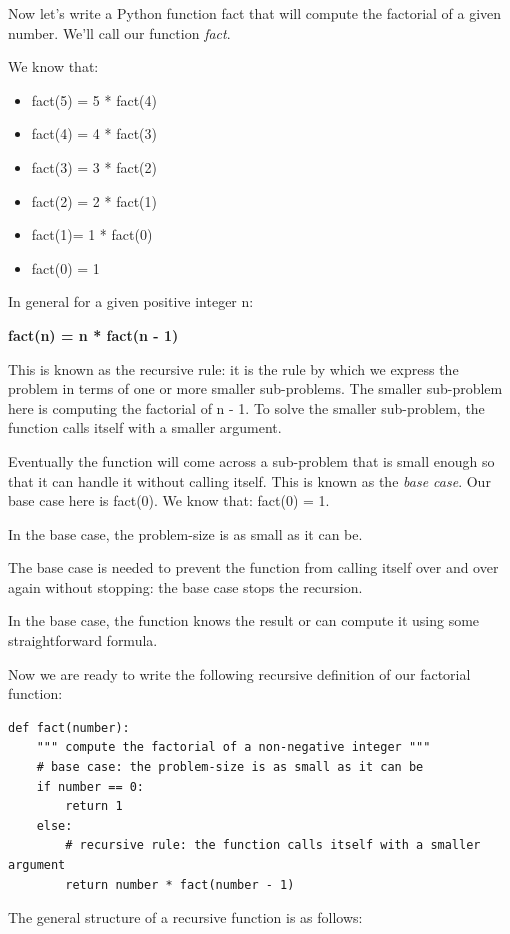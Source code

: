 \documentclass{article}
\begin{document}
Now let's write a Python function fact that will compute the factorial of a given number.  We'll call our function \textit{fact}.

We know that:
\begin{itemize}
\item fact(5) = 5 * fact(4) 
\item fact(4) = 4 * fact(3) 
\item fact(3) = 3 * fact(2) 
\item fact(2) = 2 * fact(1) 
\item fact(1)= 1 * fact(0) 
\item fact(0) = 1
\end{itemize}
 

In general for a given positive integer n:

\textbf{fact(n) = n * fact(n - 1)}

This is known as the recursive rule: it is the rule by which we express the problem in terms of one or more smaller sub-problems.  The smaller sub-problem here is computing the factorial of n - 1.  To solve the smaller sub-problem, the function calls itself with a smaller argument. 

Eventually the function will come across a sub-problem that is small enough so that it can handle it without calling itself.   This is known as the \textit{base case}.  Our base case here is fact(0).  We know that: fact(0) = 1.

In the base case, the problem-size is as small as it can be.

The base case is needed to prevent the function from calling itself over and over again without stopping: the base case stops the recursion.

In the base case, the function knows the result or can compute it using some straightforward formula.

Now we are ready to write the following recursive definition of our factorial function:

\begin{lstlisting}
def fact(number):
    """ compute the factorial of a non-negative integer """
    # base case: the problem-size is as small as it can be
    if number == 0:
        return 1
    else:
        # recursive rule: the function calls itself with a smaller argument
        return number * fact(number - 1)
\end{lstlisting}
          
The general structure of a recursive function is as follows:
\end{document}
